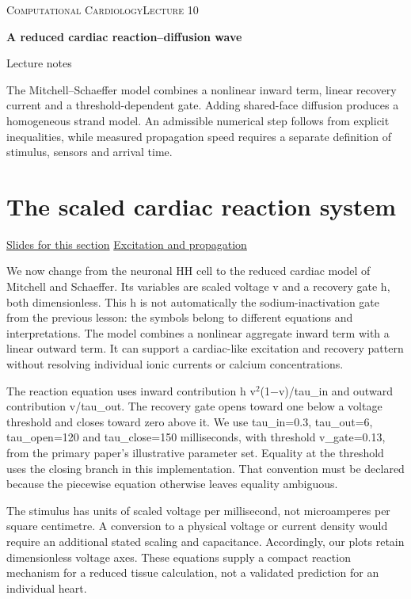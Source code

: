 \documentclass[11pt,letterpaper]{article}
\theoremstyle{definition}\newtheorem{definition}{Definition}\newtheorem{example}{Example}
\numberwithin{equation}{section}
\begin{document}
{\small\scshape Computational Cardiology\hfill Lecture 10}\par\medskip
{\raggedright{}\LARGE\bfseries\color{ink} A reduced cardiac reaction--diffusion wave\par}\medskip
{\small Lecture notes}\par\bigskip
The Mitchell--Schaeffer model combines a nonlinear inward term, linear recovery current and a threshold-dependent gate. Adding shared-face diffusion produces a homogeneous strand model. An admissible numerical step follows from explicit inequalities, while measured propagation speed requires a separate definition of stimulus, sensors and arrival time.

\section{The scaled cardiac reaction system}
\hypertarget{note-the-scaled-cardiac-reaction-system}{}\label{note:the-scaled-cardiac-reaction-system}
{\small \href{slides.html\#frame=a-scaled-cardiac-reaction-system\&step=1}{Slides for this section} \quad \href{../modules/animations/excitable-wave.html}{Excitation and propagation}}\par
We now change from the neuronal HH cell to the reduced cardiac model of Mitchell and Schaeffer. Its variables are scaled voltage v and a recovery gate h, both dimensionless. This h is not automatically the sodium-inactivation gate from the previous lesson: the symbols belong to different equations and interpretations. The model combines a nonlinear aggregate inward term with a linear outward term. It can support a cardiac-like excitation and recovery pattern without resolving individual ionic currents or calcium concentrations.

The reaction equation uses inward contribution h v\ensuremath{^{2}}(1\ensuremath{-}v)/tau\_in and outward contribution v/tau\_out. The recovery gate opens toward one below a voltage threshold and closes toward zero above it. We use tau\_in=0.3, tau\_out=6, tau\_open=120 and tau\_close=150 milliseconds, with threshold v\_gate=0.13, from the primary paper's illustrative parameter set. Equality at the threshold uses the closing branch in this implementation. That convention must be declared because the piecewise equation otherwise leaves equality ambiguous.

The stimulus has units of scaled voltage per millisecond, not microamperes per square centimetre. A conversion to a physical voltage or current density would require an additional stated scaling and capacitance. Accordingly, our plots retain dimensionless voltage axes. These equations supply a compact reaction mechanism for a reduced tissue calculation, not a validated prediction for an individual heart.
\end{document}
